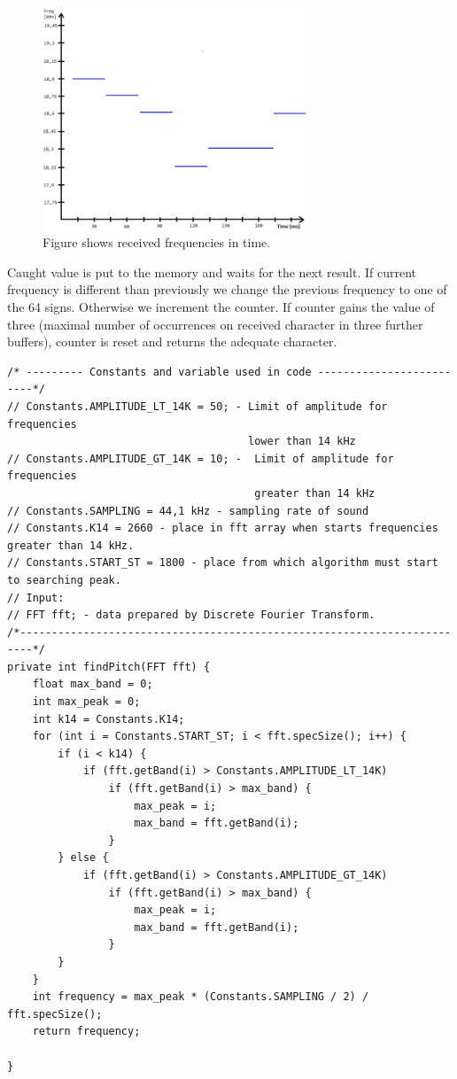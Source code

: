 \documentclass[11pt,titlepage]{article}
\theoremstyle{plain}
\begin{document}
\begin{figure}[H]
	\centering
	\includegraphics[width=0.70\textwidth]{img/receiving}
	\caption{Figure shows received frequencies in time.}
\end{figure}

Caught value is put to the memory and waits for the next result. If current frequency is different than previously we change the previous frequency to one of the 64 signs. Otherwise we increment the counter. If counter gains the value of three (maximal number of occurrences on received character in three further buffers), counter is reset and returns the adequate character.


\begin{minipage}{\linewidth}
\begin{lstlisting}
/* --------- Constants and variable used in code -------------------------*/
// Constants.AMPLITUDE_LT_14K = 50; - Limit of amplitude for frequencies
							          lower than 14 kHz		   
// Constants.AMPLITUDE_GT_14K = 10; -  Limit of amplitude for frequencies
									   greater than 14 kHz	
// Constants.SAMPLING = 44,1 kHz - sampling rate of sound
// Constants.K14 = 2660 - place in fft array when starts frequencies greater than 14 kHz.
// Constants.START_ST = 1800 - place from which algorithm must start to searching peak.
// Input:																   
// FFT fft; - data prepared by Discrete Fourier Transform.  
/*------------------------------------------------------------------------*/
private int findPitch(FFT fft) {
	float max_band = 0;
	int max_peak = 0;
	int k14 = Constants.K14;
	for (int i = Constants.START_ST; i < fft.specSize(); i++) {
		if (i < k14) {
			if (fft.getBand(i) > Constants.AMPLITUDE_LT_14K)
				if (fft.getBand(i) > max_band) {
					max_peak = i;
					max_band = fft.getBand(i);
				}
		} else {
			if (fft.getBand(i) > Constants.AMPLITUDE_GT_14K)
				if (fft.getBand(i) > max_band) {
					max_peak = i;
					max_band = fft.getBand(i);
				}
		}
	}
	int frequency = max_peak * (Constants.SAMPLING / 2) / fft.specSize();
	return frequency;

}
\end{lstlisting}
\end{minipage}
\end{document}
